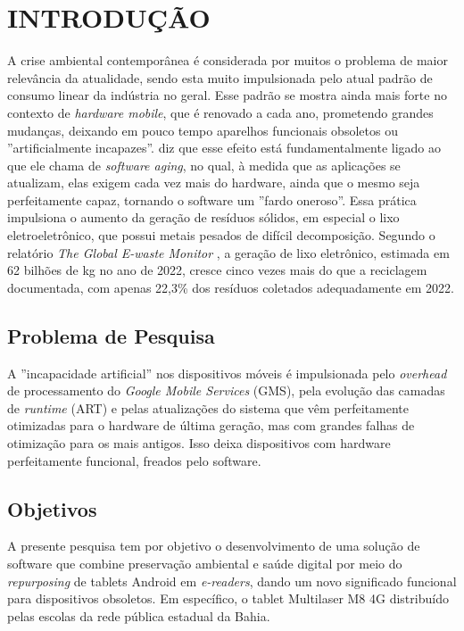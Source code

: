 \documentclass[
    12pt,
    openright,
    oneside,
    a4paper,
    english,
    brazilian
    ]{abntex2}
\begin{document}
\textual

\chapter{INTRODUÇÃO}
A crise ambiental contemporânea é considerada por muitos o problema de maior relevância da atualidade, sendo esta muito impulsionada pelo atual padrão de consumo linear da indústria no geral. Esse padrão se mostra ainda mais forte no contexto de \textit{hardware mobile}, que é renovado a cada ano, prometendo grandes mudanças, deixando em pouco tempo aparelhos funcionais obsoletos ou ''artificialmente incapazes''.  diz que esse efeito está fundamentalmente ligado ao que ele chama de \textit{software aging}, no qual, à medida que as aplicações se atualizam, elas exigem cada vez mais do hardware, ainda que o mesmo seja perfeitamente capaz, tornando o software um ''fardo oneroso''. Essa prática impulsiona o aumento da geração de resíduos sólidos, em especial o lixo eletroeletrônico, que possui metais pesados de difícil decomposição. Segundo o relatório \textit{The Global E-waste Monitor} \cite{balde2024}, a geração de lixo eletrônico, estimada em 62 bilhões de kg no ano de 2022, cresce cinco vezes mais do que a reciclagem documentada, com apenas 22,3\% dos resíduos coletados adequadamente em 2022.

\section{Problema de Pesquisa}
A ''incapacidade artificial'' nos dispositivos móveis é impulsionada pelo \textit{overhead} de processamento do \textit{Google Mobile Services} (GMS), pela evolução das camadas de \textit{runtime} (ART) e pelas atualizações do sistema que vêm perfeitamente otimizadas para o hardware de última geração, mas com grandes falhas de otimização para os mais antigos. Isso deixa dispositivos com hardware perfeitamente funcional, freados pelo software.
\section{Objetivos}
A presente pesquisa tem por objetivo o desenvolvimento de uma solução de software que combine preservação ambiental e saúde digital por meio do \textit{repurposing} de tablets Android em \textit{e-readers}, dando um novo significado funcional para dispositivos obsoletos. Em específico, o tablet Multilaser M8 4G distribuído pelas escolas da rede pública estadual da Bahia.
\end{document}
